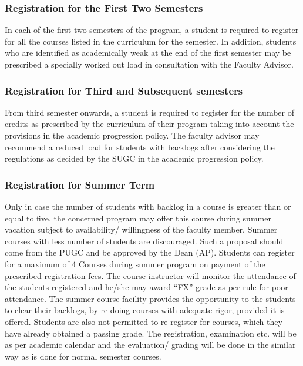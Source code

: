 \subsubsection{Registration for the First Two Semesters}

In each of the first two semesters of the program, a student is required to register for all the courses listed in the curriculum for the semester. In addition, students who are identified as academically weak at the end of the first semester may be prescribed a specially worked out load in consultation with the Faculty Advisor.

\subsubsection{Registration for Third and Subsequent semesters}

From third semester onwards, a student is required to register for the number of credits as prescribed by the curriculum of their program taking into account the provisions in the academic progression policy. The faculty advisor may recommend a reduced load for students with backlogs after considering the regulations as decided by the SUGC in the academic progression policy.

\subsubsection{Registration for Summer Term}

Only in case the number of students with backlog in a course is greater than or equal to five, the concerned program may offer this course during summer vacation subject to availability/ willingness of the faculty member. Summer courses with less number of students are discouraged. Such a proposal should come from the PUGC and be approved by the Dean (AP). Students can register for a maximum of 4 Courses during summer program on payment of the prescribed registration fees. The course instructor will monitor the attendance of the students registered and he/she may award “FX” grade as per rule for poor attendance. The summer course facility provides the opportunity to the students to clear their backlogs, by re-doing courses with adequate rigor, provided it is offered. Students are also not permitted to re-register for courses, which they have already obtained a passing grade. The registration, examination etc. will be as per academic calendar and the evaluation/ grading will be done in the similar way as is done for normal semester courses. 

